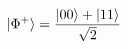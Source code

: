 \documentclass[preview]{standalone}
\begin{document}
\begin{align*}
\special{dvisvgm:raw <g id='unique000'>}|\Phi^+\rangle=\frac{|00\rangle+|11\rangle}{\sqrt{2}}\special{dvisvgm:raw </g>}
\end{align*}
\end{document}
